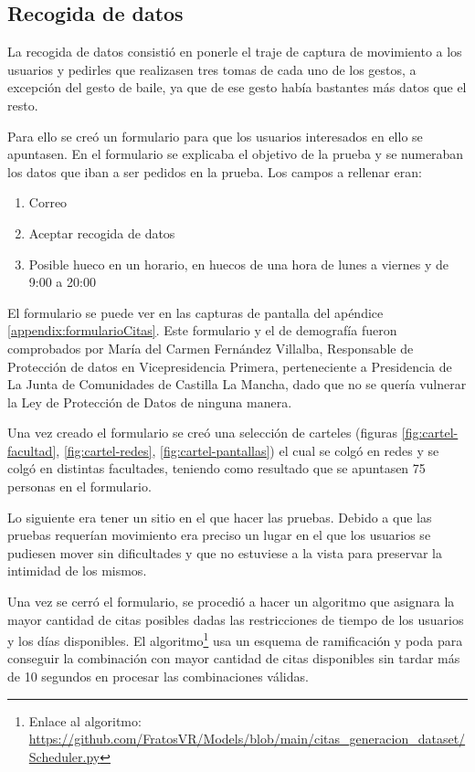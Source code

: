 \subsection{Recogida de datos}
La recogida de datos consistió en ponerle el traje de captura de movimiento a los usuarios y pedirles que realizasen tres tomas de cada uno de los gestos, a excepción del gesto de baile, ya que de ese gesto había bastantes más datos que el resto.

Para ello se creó un formulario para que los usuarios interesados en ello se apuntasen. En el formulario se explicaba el objetivo de la prueba y se numeraban los datos que iban a ser pedidos en la prueba. Los campos a rellenar eran:

\begin{enumerate}
	\item Correo
	\item Aceptar recogida de datos
	\item Posible hueco en un horario, en huecos de una hora de lunes a viernes y de 9:00 a 20:00
\end{enumerate}

El formulario se puede ver en las capturas de pantalla del apéndice \ref{appendix:formularioCitas}. Este formulario y el de demografía fueron comprobados por María del Carmen Fernández Villalba, Responsable de Protección de datos en Vicepresidencia Primera, perteneciente a Presidencia de La Junta de Comunidades de Castilla La Mancha, dado que no se quería vulnerar la Ley de Protección de Datos de ninguna manera.

Una vez creado el formulario se creó una selección de carteles (figuras \ref{fig:cartel-facultad}, \ref{fig:cartel-redes}, \ref{fig:cartel-pantallas}) el cual se colgó en redes y se colgó en distintas facultades, teniendo como resultado que se apuntasen 75 personas en el formulario.

Lo siguiente era tener un sitio en el que hacer las pruebas. Debido a que las pruebas requerían movimiento era preciso un lugar en el que los usuarios se pudiesen mover sin dificultades y que no estuviese a la vista para preservar la intimidad de los mismos.

Una vez se cerró el formulario, se procedió a hacer un algoritmo que asignara la mayor cantidad de citas posibles dadas las restricciones de tiempo de los usuarios y los días disponibles. El algoritmo\footnote{Enlace al algoritmo: \url{https://github.com/FratosVR/Models/blob/main/citas_generacion_dataset/Scheduler.py}} usa un esquema de ramificación y poda para conseguir la combinación con mayor cantidad de citas disponibles sin tardar más de 10 segundos en procesar las combinaciones válidas.

